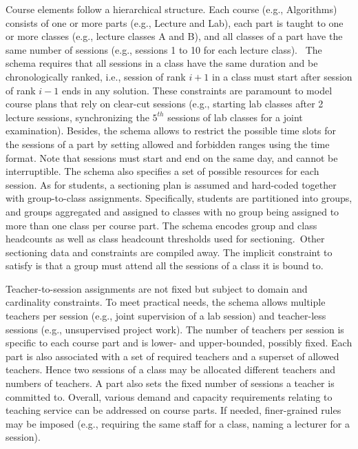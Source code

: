 \documentclass[runningheads]{llncs}
\begin{document}
Course elements follow a hierarchical structure.
Each course (e.g., Algorithms) consists of one or more parts (e.g., Lecture and Lab),
each part is taught to one or more classes (e.g., lecture classes A and B),
and all classes of a part have the same number of sessions (e.g., sessions 1 to 10 for each lecture class).
~The schema requires that all sessions in a class have the same duration
and be chronologically ranked,
i.e., session of rank $i+1$ in a class must start after session of rank $i-1$ ends in any solution.
These constraints are paramount to model course plans that rely on clear-cut sessions
(e.g., starting lab classes after 2 lecture sessions,
synchronizing the $5^{th}$ sessions of lab classes for a joint examination).
Besides, the schema allows to restrict the possible time slots for the sessions of a part
by setting allowed and forbidden ranges using the time format.
Note that 
sessions must start and end on the same day, and cannot be interruptible. The schema also specifies a set of possible resources for each session.
As for students, a sectioning plan
is assumed and hard-coded together with group-to-class assignments.
Specifically, 
students are partitioned into groups,
and groups aggregated and assigned to classes
with no group being assigned to more than one class per course part.
The schema encodes group and class headcounts
as well as class headcount thresholds used for sectioning.~Other sectioning data and constraints are compiled away.
The implicit constraint to satisfy is that a group must attend all the sessions of a class it is bound to.


Teacher-to-session assignments are not fixed
but subject to domain and cardinality constraints.
To meet practical needs, 
the schema allows multiple teachers per session
(e.g., joint supervision of a lab session) and teacher-less sessions 
(e.g., unsupervised project work).
The number of teachers per session is specific to each course part
and is lower- and upper-bounded, possibly fixed.
Each part is also associated with 
a set of required teachers
and a superset of allowed teachers.
Hence two sessions of a class may be allocated different teachers and numbers of teachers.
A part also sets the fixed number of sessions a teacher is committed to.
Overall, various demand and capacity requirements relating to teaching service 
can be addressed on course parts.
If needed, finer-grained rules may be imposed
(e.g., requiring the same staff for a class, naming a lecturer for a session).
\end{document}
